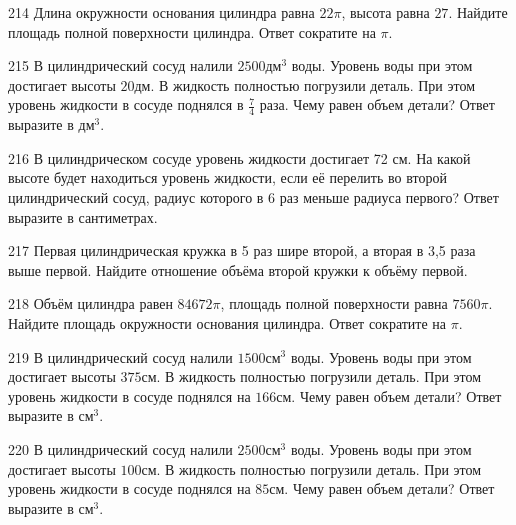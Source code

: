 \documentclass[4apaper]{article}
\begin{document}
\begin{taskBN}{214}
Длина окружности основания цилиндра равна $22\pi$, высота равна $27$. Найдите площадь полной поверхности цилиндра. Ответ сократите на $\pi$.
\end{taskBN}

\begin{taskBN}{215}
В цилиндрический сосуд налили $2500\mbox{дм}^3$ воды. Уровень воды при этом достигает высоты $20$дм. В жидкость полностью погрузили деталь. При этом уровень жидкости в сосуде поднялся в $\frac{7}{4}$ раза. Чему равен объем детали? Ответ выразите в $\mbox{дм}^3$.
\end{taskBN}

\begin{taskBN}{216}
В цилиндрическом сосуде уровень жидкости достигает 72 см. На какой высоте будет находиться уровень жидкости, если её перелить во второй цилиндрический сосуд, радиус которого в 6 раз меньше радиуса первого? Ответ выразите в сантиметрах.
\end{taskBN}

\begin{taskBN}{217}
 Первая цилиндрическая кружка в 5 раз шире второй, а вторая в 3,5 раза выше первой. Найдите отношение объёма второй кружки к объёму первой.
\end{taskBN}

\begin{taskBN}{218}
Объём цилиндра равен $84672\pi$, площадь полной поверхности равна $7560\pi$. Найдите площадь окружности основания цилиндра. Ответ сократите на $\pi$.
\end{taskBN}

\begin{taskBN}{219}
В цилиндрический сосуд налили $1500\mbox{см}^3$ воды. Уровень воды при этом достигает высоты $375$см. В жидкость полностью погрузили деталь. При этом уровень жидкости в сосуде поднялся на $166$см. Чему равен объем детали? Ответ выразите в $\mbox{см}^3$.
\end{taskBN}

\begin{taskBN}{220}
В цилиндрический сосуд налили $2500\mbox{см}^3$ воды. Уровень воды при этом достигает высоты $100$см. В жидкость полностью погрузили деталь. При этом уровень жидкости в сосуде поднялся на $85$см. Чему равен объем детали? Ответ выразите в $\mbox{см}^3$.
\end{taskBN}
\end{document}

